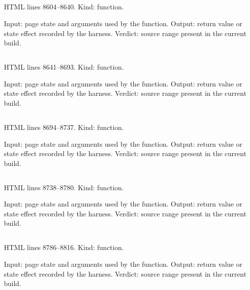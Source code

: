 \subsection*{\texttt{}}
\label{vf_470_exportCatalogue}
HTML lines 8604--8640. Kind: function.

Input: page state and arguments used by the function.
Output: return value or state effect recorded by the harness.
Verdict: source range present in the current build.

\subsection*{\texttt{}}
\label{vf_471_exportCatalogueCore}
HTML lines 8641--8693. Kind: function.

Input: page state and arguments used by the function.
Output: return value or state effect recorded by the harness.
Verdict: source range present in the current build.

\subsection*{\texttt{}}
\label{vf_472_bundleZip}
HTML lines 8694--8737. Kind: function.

Input: page state and arguments used by the function.
Output: return value or state effect recorded by the harness.
Verdict: source range present in the current build.

\subsection*{\texttt{}}
\label{vf_473_bundleReadme}
HTML lines 8738--8780. Kind: function.

Input: page state and arguments used by the function.
Output: return value or state effect recorded by the harness.
Verdict: source range present in the current build.

\subsection*{\texttt{}}
\label{vf_474_renderLoaded}
HTML lines 8786--8816. Kind: function.

Input: page state and arguments used by the function.
Output: return value or state effect recorded by the harness.
Verdict: source range present in the current build.


